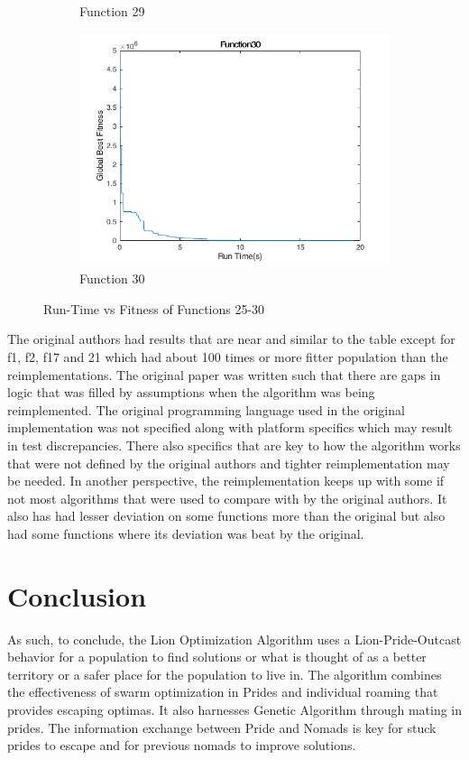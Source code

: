 \begin{figure}
\begin{subfigure}[b]{0.4\textwidth}
    \caption{Function 29}
  \end{subfigure}
  \begin{subfigure}[b]{0.4\textwidth}
    \includegraphics[width=\textwidth]{img/cecrt/f30}
    \caption{Function 30}
  \end{subfigure}
  \caption{Run-Time vs Fitness of Functions 25-30}
\end{figure}

\clearpage


The original authors had results that are near and similar to the table except for f1, f2, f17 and 21 which had about 100 times or more fitter population than the reimplementations. The original paper was written such that there are gaps in logic that was filled by assumptions when the algorithm was being reimplemented. The original programming language used in the original implementation was not specified along with platform specifics which may result in test discrepancies. There also specifics that are key to how the algorithm works that were not defined by the original authors and tighter reimplementation may be needed. In another perspective, the reimplementation keeps up with some if not most algorithms that were used to compare with by the original authors. It also has had lesser deviation on some functions more than the original but also had some functions where its deviation was beat by the original.

\section{Conclusion}

As such, to conclude, the Lion Optimization Algorithm uses a Lion-Pride-Outcast behavior for a population to find solutions or what is thought of as a better territory or a safer place for the population to live in. The algorithm combines the effectiveness of swarm optimization in Prides and individual roaming that provides escaping optimas. It also harnesses Genetic Algorithm through mating in prides. The information exchange between Pride and Nomads is key for stuck prides to escape and for previous nomads to improve solutions.
